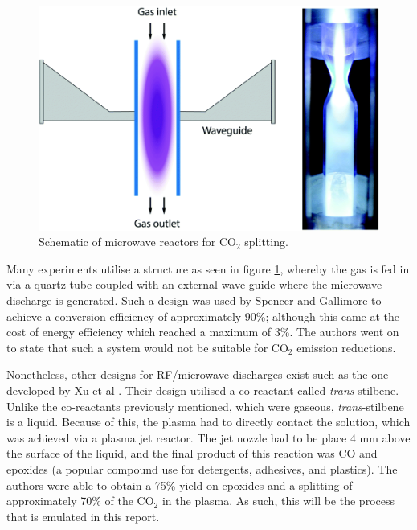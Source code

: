 \begin{figure}[h!]
	\centering
	\includegraphics[width=0.6\linewidth]{chapter_3/figures/mw_reactor.png}
	\caption{Schematic of microwave reactors for CO$_2$ splitting. \cite{Snoeckx2017}}
	\label{fig:mw_reactor}
\end{figure}

Many experiments utilise a structure as seen in figure \ref{fig:mw_reactor}, whereby the gas is fed in via a quartz tube coupled with an external wave guide where the microwave discharge is generated. Such a design was used by Spencer and Gallimore \cite{spencer_gallimore_2010} to achieve a conversion efficiency of approximately 90\%; although this came at the cost of energy efficiency which reached a maximum of 3\%. The authors went on to state that such a system would not be suitable for  CO$_2$ emission reductions.

Nonetheless, other designs for RF/microwave discharges exist such as the one developed by Xu et al \cite{Xu2021}. Their design utilised a co-reactant called \textit{trans}-stilbene. Unlike the co-reactants previously mentioned, which were  gaseous, \textit{trans}-stilbene is a liquid. Because of this, the plasma had to directly contact the solution, which was achieved via a plasma jet reactor. The jet nozzle had to be place 4 mm above the surface of the liquid, and the final product of this reaction was CO and epoxides (a popular compound use for detergents, adhesives, and plastics). The authors were able to obtain a 75\% yield on epoxides and a splitting of approximately 70\% of the CO$_2$ in the plasma. As such, this will be the process that is emulated in this report.


